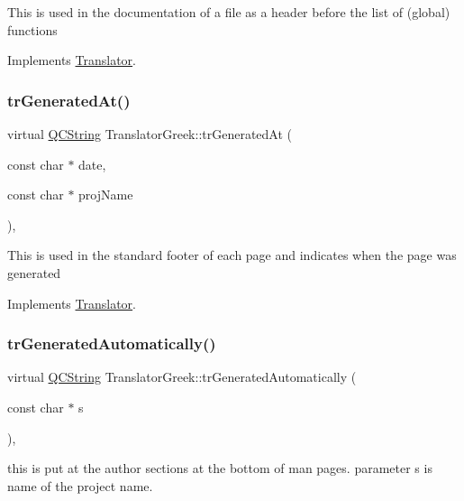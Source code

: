 This is used in the documentation of a file as a header before the list of (global) functions 

Implements \mbox{\hyperlink{class_translator}{Translator}}.

\mbox{\label{class_translator_greek_ab504f9fb3e4b5ca7cb605de72f5139fa}} 
\subsubsection{\texorpdfstring{trGeneratedAt()}{trGeneratedAt()}}
{\footnotesize\ttfamily virtual \mbox{\hyperlink{class_q_c_string}{Q\+C\+String}} Translator\+Greek\+::tr\+Generated\+At (\begin{DoxyParamCaption}\item[{const char $\ast$}]{date,  }\item[{const char $\ast$}]{proj\+Name }\end{DoxyParamCaption})\hspace{0.3cm}{\ttfamily [inline]}, {\ttfamily [virtual]}}

This is used in the standard footer of each page and indicates when the page was generated 

Implements \mbox{\hyperlink{class_translator}{Translator}}.

\mbox{\label{class_translator_greek_ab9c0c82c7d4312d18c63e0ac611ef030}} 
\subsubsection{\texorpdfstring{trGeneratedAutomatically()}{trGeneratedAutomatically()}}
{\footnotesize\ttfamily virtual \mbox{\hyperlink{class_q_c_string}{Q\+C\+String}} Translator\+Greek\+::tr\+Generated\+Automatically (\begin{DoxyParamCaption}\item[{const char $\ast$}]{s }\end{DoxyParamCaption})\hspace{0.3cm}{\ttfamily [inline]}, {\ttfamily [virtual]}}

this is put at the author sections at the bottom of man pages. parameter s is name of the project name. 

